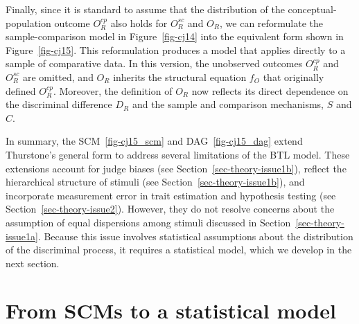 \documentclass[
  authoryear,
  review,
  1p]{elsarticle}
\begin{document}
Finally, since it is standard to assume that the distribution of the
conceptual-population outcome \(O^{cp}_{R}\) also holds for
\(O^{sc}_{R}\) and \(O_{R}\), we can reformulate the sample-comparison
model in Figure~\ref{fig-cj14} into the equivalent form shown in
Figure~\ref{fig-cj15}. This reformulation produces a model that applies
directly to a sample of comparative data. In this version, the
unobserved outcomes \(O^{cp}_{R}\) and \(O^{sc}_{R}\) are omitted, and
\(O_{R}\) inherits the structural equation \(f_{O}\) that originally
defined \(O^{cp}_{R}\). Moreover, the definition of \(O_{R}\) now
reflects its direct dependence on the discriminal difference \(D_{R}\)
and the sample and comparison mechanisms, \(S\) and \(C\).

In summary, the SCM~\ref{fig-cj15_scm} and DAG~\ref{fig-cj15_dag} extend
Thurstone's general form to address several limitations of the BTL
model. These extensions account for judge biases (see
Section~\ref{sec-theory-issue1b}), reflect the hierarchical structure of
stimuli (see Section~\ref{sec-theory-issue1b}), and incorporate
measurement error in trait estimation and hypothesis testing (see
Section~\ref{sec-theory-issue2}). However, they do not resolve concerns
about the assumption of equal dispersions among stimuli discussed in
Section~\ref{sec-theory-issue1a}. Because this issue involves
statistical assumptions about the distribution of the discriminal
process, it requires a statistical model, which we develop in the next
section.

\section{From SCMs to a statistical model}\label{sec-statistical}
\end{document}
